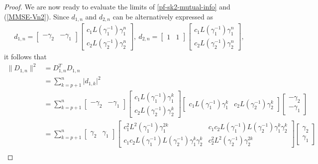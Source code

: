 \documentclass[12pt]{article}
\begin{document}
\begin{proof}
We are now ready to evaluate the limits of \eqref{pf-sk2-mutual-info} and (\ref{MMSE-Vn2}). Since $d_{1,n}$ and $d_{2,n}$ can be alternatively expressed as 
\begin{equation*}
\begin{aligned}
d_{1,n}=\begin{bmatrix}-\gamma_2 &-\gamma_1\end{bmatrix} \begin{bmatrix} c_1L(\gamma_1^{-1})\gamma_1^n\\[2pt]c_2L(\gamma_2^{-1})\gamma_2^n\end{bmatrix}, ~
d_{2,n}=\begin{bmatrix}1&1 \end{bmatrix}\begin{bmatrix} c_1L(\gamma_1^{-1})\gamma_1^n\\[2pt]c_2L(\gamma_2^{-1})\gamma_2^n\end{bmatrix},
\end{aligned}
\end{equation*}
it follows that
\begin{equation}\label{2norm-D1n}
\begin{aligned}
\|D_{1,n}\|^2&=D^T_{1,n}D_{1,n}     \\
 &=\sum_{k=p+1}^n\vert d_{1,k}\vert^2\\
&=\sum_{k=p+1}^n\begin{bmatrix}-\gamma_2&-\gamma_1\end{bmatrix}\begin{bmatrix}c_1L(\gamma_1^{-1})\gamma_1^k\\[2pt]c_2L(\gamma_2^{-1})\gamma_2^k\end{bmatrix}\begin{bmatrix}c_1L(\gamma_1^{-1})\gamma_1^k&c_2L(\gamma_2^{-1})\gamma_2^k\end{bmatrix}\begin{bmatrix}-\gamma_2\\[2pt]-\gamma_1\end{bmatrix} \\[2pt]
&=\sum_{k=p+1}^n \begin{bmatrix}\gamma_2&\gamma_1\end{bmatrix}\begin{bmatrix} c_1^2L^2(\gamma_1^{-1})\gamma_1^{2k} & c_1c_2L(\gamma_1^{-1})L(\gamma_2^{-1})\gamma_1^k \gamma_2^k\\[2pt]c_1c_2L(\gamma_1^{-1})L(\gamma_2^{-1})\gamma_1^k \gamma_2^k & c_2^2L^2(\gamma_2^{-1})\gamma_2^{2k}\end{bmatrix} \begin{bmatrix}\gamma_2\\[2pt]\gamma_1\end{bmatrix}\\[2pt]

\end{aligned}
\end{equation}
\end{proof}
\end{document}
